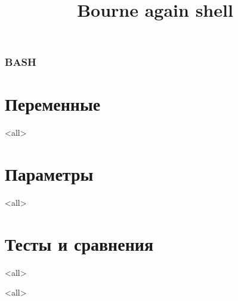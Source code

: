
\title[bash]{Bourne again shell}




\begin{frame}
	\frametitle{BASH}
	\titlepage
	\vspace{-0.5cm}
	\begin{center}
	\end{center}
\end{frame}

\begin{frame}
	\tableofcontents
	[hideallsubsections]
\end{frame}


\section{Переменные}

\mode<all>{}

\section{Параметры}

\mode<all>{}

\section{Тесты и сравнения}

\mode<all>{}


\mode<all>

